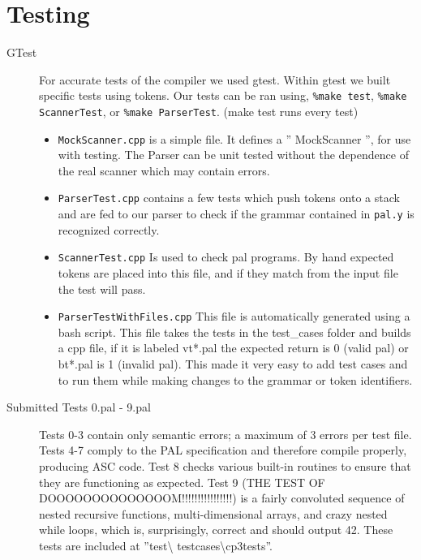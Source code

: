\documentclass{article}
\begin{document}
\section*{Testing}
\begin{description}
	
\item[GTest]
	For accurate tests of the compiler we used gtest. Within gtest we
	built specific tests using tokens. Our tests can be ran using,
	\texttt{\%make test}, \texttt{\%make ScannerTest}, or \texttt{\%make ParserTest}.
	(make test runs every test)
	\begin{itemize}
		\item \texttt{MockScanner.cpp} is a simple file. It defines a 
		'' MockScanner '', for use with testing. The Parser can be unit tested
		without the dependence of the real scanner which may contain errors.
		\item \texttt{ParserTest.cpp} contains a few tests which push
		tokens onto a stack and are fed to our parser to check if the 
		grammar contained in  \texttt{pal.y} is recognized correctly.
		
		\item \texttt{ScannerTest.cpp} Is used to check pal programs.
		By hand expected tokens are placed into this file, and if they match
		from the input file the test will pass.
		
		\item \texttt{ParserTestWithFiles.cpp} This file is automatically
		generated using a bash script. This file takes the tests in
		the test\_cases folder and builds a cpp file, if it is labeled vt*.pal
		the expected return is 0 (valid pal) or bt*.pal is 1 (invalid pal).
		This made it very easy to add test cases and to run them while making 
		changes to the grammar or token identifiers.
	\end{itemize}
\item[Submitted Tests 0.pal - 9.pal]
	Tests 0-3 contain only semantic errors; a maximum of 3 errors per test file. Tests 4-7 comply to
	the PAL specification and therefore compile properly, producing ASC code. Test 8 checks various built-in
	routines to ensure that they are functioning as expected. Test 9 (THE TEST OF DOOOOOOOOOOOOOOM!!!!!!!!!!!!!!!!)
	is a fairly convoluted sequence of nested recursive functions, multi-dimensional arrays, and crazy nested while loops,
	which is, surprisingly, correct and should output 42.  
	These tests are included at ''test\textbackslash 
	test\textunderscore cases\textbackslash cp3tests''.
\end{description}
\end{document}
